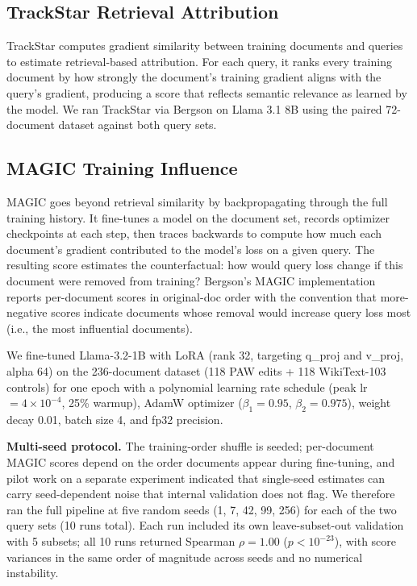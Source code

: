 \documentclass{article}
\begin{document}
\subsection{TrackStar Retrieval Attribution}

TrackStar \citep{chang2024scalable} computes gradient similarity between training documents and queries to estimate retrieval-based attribution. For each query, it ranks every training document by how strongly the document's training gradient aligns with the query's gradient, producing a score that reflects semantic relevance as learned by the model. We ran TrackStar via Bergson on Llama 3.1 8B using the paired 72-document dataset against both query sets.

\subsection{MAGIC Training Influence}

MAGIC goes beyond retrieval similarity by backpropagating through the full training history. It fine-tunes a model on the document set, records optimizer checkpoints at each step, then traces backwards to compute how much each document's gradient contributed to the model's loss on a given query. The resulting score estimates the counterfactual: how would query loss change if this document were removed from training? Bergson's MAGIC implementation reports per-document scores in original-doc order with the convention that more-negative scores indicate documents whose removal would increase query loss most (i.e., the most influential documents).

We fine-tuned Llama-3.2-1B with LoRA (rank 32, targeting q\_proj and v\_proj, alpha 64) on the 236-document dataset (118 PAW edits + 118 WikiText-103 controls) for one epoch with a polynomial learning rate schedule (peak lr $= 4 \times 10^{-4}$, 25\% warmup), AdamW optimizer ($\beta_1 = 0.95$, $\beta_2 = 0.975$), weight decay 0.01, batch size 4, and fp32 precision.

\textbf{Multi-seed protocol.} The training-order shuffle is seeded; per-document MAGIC scores depend on the order documents appear during fine-tuning, and pilot work on a separate experiment indicated that single-seed estimates can carry seed-dependent noise that internal validation does not flag. We therefore ran the full pipeline at five random seeds (1, 7, 42, 99, 256) for each of the two query sets (10 runs total). Each run included its own leave-subset-out validation with 5 subsets; all 10 runs returned Spearman $\rho = 1.00$ ($p < 10^{-23}$), with score variances in the same order of magnitude across seeds and no numerical instability.
\end{document}
